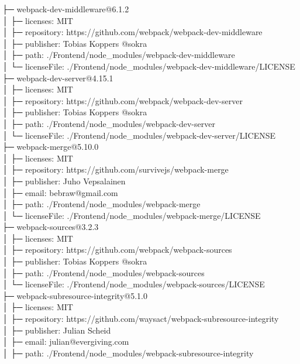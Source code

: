 ├─ webpack-dev-middleware@6.1.2\\
│  ├─ licenses: MIT\\
│  ├─ repository: https://github.com/webpack/webpack-dev-middleware\\
│  ├─ publisher: Tobias Koppers @sokra\\
│  ├─ path: ./Frontend/node\_modules/webpack-dev-middleware\\
│  └─ licenseFile: ./Frontend/node\_modules/webpack-dev-middleware/LICENSE\\
├─ webpack-dev-server@4.15.1\\
│  ├─ licenses: MIT\\
│  ├─ repository: https://github.com/webpack/webpack-dev-server\\
│  ├─ publisher: Tobias Koppers @sokra\\
│  ├─ path: ./Frontend/node\_modules/webpack-dev-server\\
│  └─ licenseFile: ./Frontend/node\_modules/webpack-dev-server/LICENSE\\
├─ webpack-merge@5.10.0\\
│  ├─ licenses: MIT\\
│  ├─ repository: https://github.com/survivejs/webpack-merge\\
│  ├─ publisher: Juho Vepsalainen\\
│  ├─ email: bebraw@gmail.com\\
│  ├─ path: ./Frontend/node\_modules/webpack-merge\\
│  └─ licenseFile: ./Frontend/node\_modules/webpack-merge/LICENSE\\
├─ webpack-sources@3.2.3\\
│  ├─ licenses: MIT\\
│  ├─ repository: https://github.com/webpack/webpack-sources\\
│  ├─ publisher: Tobias Koppers @sokra\\
│  ├─ path: ./Frontend/node\_modules/webpack-sources\\
│  └─ licenseFile: ./Frontend/node\_modules/webpack-sources/LICENSE\\
├─ webpack-subresource-integrity@5.1.0\\
│  ├─ licenses: MIT\\
│  ├─ repository: https://github.com/waysact/webpack-subresource-integrity\\
│  ├─ publisher: Julian Scheid\\
│  ├─ email: julian@evergiving.com\\
│  ├─ path: ./Frontend/node\_modules/webpack-subresource-integrity\\

